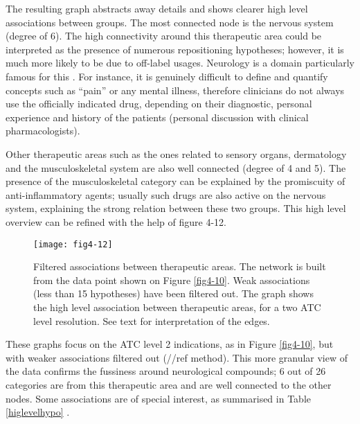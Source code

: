The resulting graph abstracts away details and shows clearer high level associations between groups. The most connected node is the nervous system (degree of 6). The high connectivity around this therapeutic area could be interpreted as the presence of numerous repositioning hypotheses; however, it is much more likely to be due to off-label usages. Neurology is a domain particularly famous for this \citep{cras2007off}. For instance, it is genuinely difficult to define and quantify concepts such as “pain” \citep{bonica1979need} or any mental illness, therefore clinicians do not always use the officially indicated drug, depending on their diagnostic, personal experience and history of the patients (personal discussion with clinical pharmacologists).

Other therapeutic areas such as the ones related to sensory organs, dermatology and the musculoskeletal system are also well connected (degree of 4 and 5). The presence of the musculoskeletal category can be explained by the promiscuity of anti-inflammatory agents; usually such drugs are also active on the nervous system, explaining the strong relation between these two groups. This high level overview can be refined with the help of figure 4-12.

\begin{figure}[H]
    \centering
    \texttt{[image: fig4-12]}
    \caption{Filtered associations between therapeutic areas. The network is built from the data point shown on Figure \ref{fig4-10}. Weak associations (less than 15 hypotheses) have been filtered out. The graph shows the high level association between therapeutic areas, for a two ATC level resolution. See text for interpretation of the edges.}
    \label{fig4-12}
\end{figure}

These graphs focus on the ATC level 2 indications, as in Figure \ref{fig4-10}, but with weaker associations filtered out (//ref method). This more granular view of the data confirms the fussiness around neurological compounds; 6 out of 26 categories are from this therapeutic area and are well connected to the other nodes. Some associations are of special interest, as summarised in Table \ref{higlevelhypo} .

